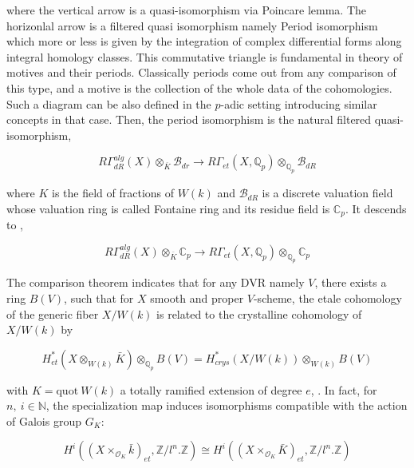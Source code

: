 \documentclass[12pt,twoside]{amsart}
\begin{document}
\vspace{0.5cm}

\noindent
where the vertical arrow is a quasi-isomorphism via Poincare lemma. The horizonlal arrow is a filtered quasi isomorphism namely Period isomorphism which more or less is given by the integration of complex differential forms along integral homology classes. This commutative triangle is fundamental in theory of motives and their periods. Classically periods come out from any comparison of this type, and a motive is the collection of the whole data of the cohomologies. Such a diagram can be also defined in the $p$-adic setting introducing similar concepts in that case. Then, the period isomorphism is the natural filtered quasi-isomorphism,

\[ R\Gamma_{dR}^{alg}(X) \otimes_{\overline{K}}\mathcal{B}_{dr} \rightarrow R\Gamma_{et}(X,\mathbb{Q}_p) \otimes_{\mathbb{Q}_p} \mathcal{B}_{dR} \] 

\vspace{0.5cm}

\noindent
where $K$ is the field of fractions of $W(k)$ and $\mathcal{B}_{dR}$ is a discrete valuation field whose valuation ring is called Fontaine ring and its residue field is $\mathbb{C}_p$. It descends to ,

\[ R\Gamma_{dR}^{alg}(X) \otimes_{\overline{K}}\mathbb{C}_p \rightarrow R\Gamma_{et}(X,\mathbb{Q}_p) \otimes_{\mathbb{Q}_p} \mathbb{C}_p \]

\vspace{0.5cm}

\noindent
The comparison theorem indicates that for any DVR namely $V$, there exists a ring $B(V)$, such that for $X$ smooth and proper $V$-scheme, the etale cohomology of the generic fiber $X/W(k)$ is related to the crystalline cohomology of $X/W(k)$ by

\[ H_{et}^*(X \otimes_{W(k)} \bar{K}) \otimes_{\mathbb{Q}_p} B(V) =H_{crys}^*(X/W(k)) \otimes_{W(k)} B(V) \]

\vspace{0.5cm}

\noindent
with $K= \text{quot}\ W(k)$ a totally ramified extension of degree $e$, \cite{FA}. In fact, for $n , \ i\in \mathbb{N}$, the specialization map induces isomorphisms compatible with the action of Galois group $G_K$:

\[ H^i((X \times_{\mathcal{O}_K} \bar{k})_{et},\mathbb{Z}/l^n. \mathbb{Z}) \cong H^i((X \times_{\mathcal{O}_K} \bar{K})_{et},\mathbb{Z}/l^n. \mathbb{Z}) \]
\end{document}
